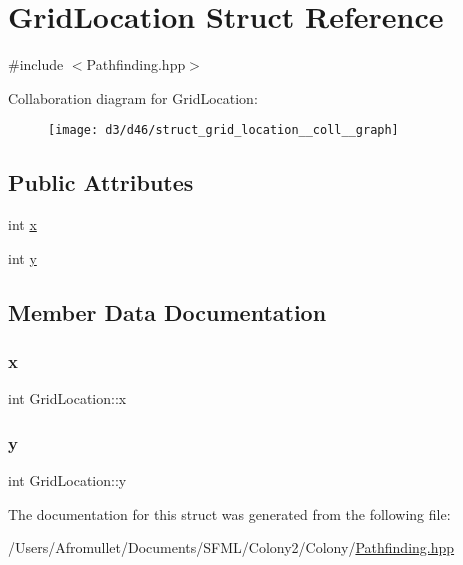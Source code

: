 \hypertarget{struct_grid_location}{}\section{Grid\+Location Struct Reference}
\label{struct_grid_location}


{\ttfamily \#include $<$Pathfinding.\+hpp$>$}



Collaboration diagram for Grid\+Location\+:
\nopagebreak
\begin{figure}[H]
\begin{center}
\leavevmode
\texttt{[image: d3/d46/struct\_grid\_location\_\_coll\_\_graph]}
\end{center}
\end{figure}
\subsection*{Public Attributes}
\begin{DoxyCompactItemize}
\item 
int \mbox{\hyperlink{struct_grid_location_aeb63882b21b183e7335258a58c8a40e8}{x}}
\item 
int \mbox{\hyperlink{struct_grid_location_aa73f11982d6425de33e1cd4a5a4c7ac6}{y}}
\end{DoxyCompactItemize}


\subsection{Member Data Documentation}
\mbox{\label{struct_grid_location_aeb63882b21b183e7335258a58c8a40e8}} 
\subsubsection{\texorpdfstring{x}{x}}
{\footnotesize\ttfamily int Grid\+Location\+::x}

\mbox{\label{struct_grid_location_aa73f11982d6425de33e1cd4a5a4c7ac6}} 
\subsubsection{\texorpdfstring{y}{y}}
{\footnotesize\ttfamily int Grid\+Location\+::y}



The documentation for this struct was generated from the following file\+:\begin{DoxyCompactItemize}
\item 
/\+Users/\+Afromullet/\+Documents/\+S\+F\+M\+L/\+Colony2/\+Colony/\mbox{\hyperlink{_pathfinding_8hpp}{Pathfinding.\+hpp}}\end{DoxyCompactItemize}
